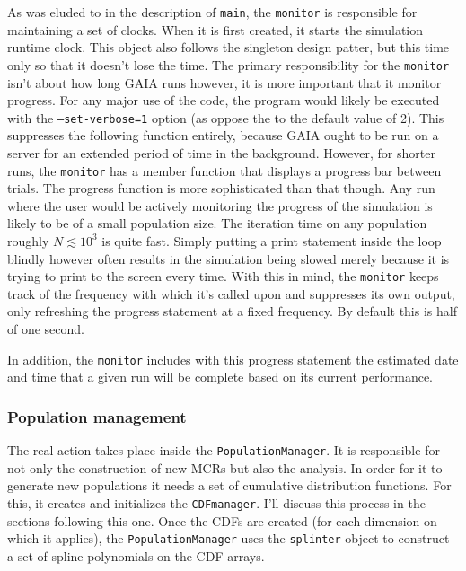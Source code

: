 \documentclass[10pt,a4paper,final]{article}
\numberwithin{equation}{section}
\begin{document}
\begin{multicols}{2}[]
				As was eluded to in the description of \texttt{main}, the \texttt{monitor}
				is responsible for maintaining a set of clocks. When it is first created,
				it starts the simulation runtime clock. This object also follows the 
				singleton design patter, but this time only so that it doesn't lose the
				time. The primary responsibility for the \texttt{monitor} isn't about
				how long GAIA runs however, it is more important that it monitor progress.
				For any major use of the code, the program would likely be executed with
				the \texttt{--set-verbose=1} option (as oppose the to the default value of 2). 
				This suppresses the following function entirely, because GAIA ought to be
				run on a server for an extended period of time in the background. However,
				for shorter runs, the \texttt{monitor} has a member function that displays
				a progress bar between trials. The progress function is more sophisticated
				than that though. Any run where the user would be actively monitoring the
				progress of the simulation is likely to be of a small population size.
				The iteration time on any population roughly $N\lesssim10^3$ is quite fast.
				Simply putting a print statement inside the loop blindly however often results
				in the simulation being slowed merely because it is trying to print to the
				screen every time. With this in mind, the \texttt{monitor} keeps track of
				the frequency with which it's called upon and suppresses its own output,
				only refreshing the progress statement at a fixed frequency. By default this
				is half of one second.

				In addition, the \texttt{monitor} includes with this progress statement
				the estimated date and time that a given run will be complete based on its
				current performance.

			\subsubsection{Population management}
				
				The real action takes place inside the \texttt{PopulationManager}. It is
				responsible for not only the construction of new MCRs but also the 
				analysis. In order for it to generate new populations it needs a set
				of cumulative distribution functions. For this, it creates and initializes
				the \texttt{CDFmanager}. I'll discuss this process in the sections following
				this one. Once the CDFs are created (for each dimension on which it applies),
				the \texttt{PopulationManager} uses the \texttt{splinter} object to
				construct a set of spline polynomials on the CDF arrays. 


\end{multicols}
\end{document}
